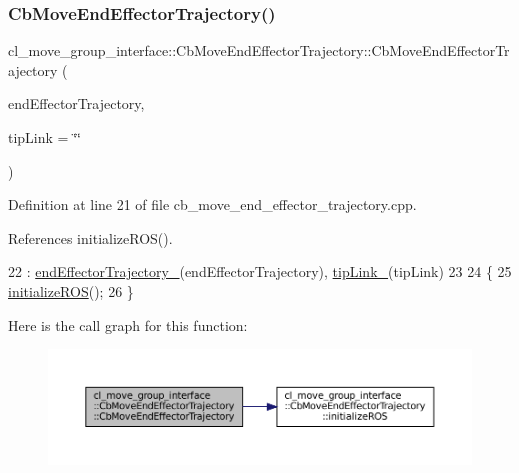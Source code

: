 \subsubsection{\texorpdfstring{Cb\+Move\+End\+Effector\+Trajectory()}{CbMoveEndEffectorTrajectory()}\hspace{0.1cm}{\footnotesize\ttfamily [2/2]}}
{\footnotesize\ttfamily cl\+\_\+move\+\_\+group\+\_\+interface\+::\+Cb\+Move\+End\+Effector\+Trajectory\+::\+Cb\+Move\+End\+Effector\+Trajectory (\begin{DoxyParamCaption}\item[{const std\+::vector$<$ geometry\+\_\+msgs\+::\+Pose\+Stamped $>$ \&}]{end\+Effector\+Trajectory,  }\item[{std\+::string}]{tip\+Link = {\ttfamily \char`\"{}\char`\"{}} }\end{DoxyParamCaption})}



Definition at line 21 of file cb\+\_\+move\+\_\+end\+\_\+effector\+\_\+trajectory.\+cpp.



References initialize\+R\+O\+S().


\begin{DoxyCode}
22         : \hyperlink{classcl__move__group__interface_1_1CbMoveEndEffectorTrajectory_ae13dfd31ea3660646e03882f0c2c29f0}{endEffectorTrajectory\_}(endEffectorTrajectory), 
      \hyperlink{classcl__move__group__interface_1_1CbMoveEndEffectorTrajectory_a24c6c30b9b0761a61fa002d947bd3e11}{tipLink\_}(tipLink)
23 
24     \{
25         \hyperlink{classcl__move__group__interface_1_1CbMoveEndEffectorTrajectory_afcee8f3853a5cef8806137a304c8a14b}{initializeROS}();
26     \}
\end{DoxyCode}
Here is the call graph for this function\+:
\nopagebreak
\begin{figure}[H]
\begin{center}
\leavevmode
\includegraphics[width=350pt]{classcl__move__group__interface_1_1CbMoveEndEffectorTrajectory_ae6985de3f8f0e1ec7dea88c1e551889a_cgraph}
\end{center}
\end{figure}


